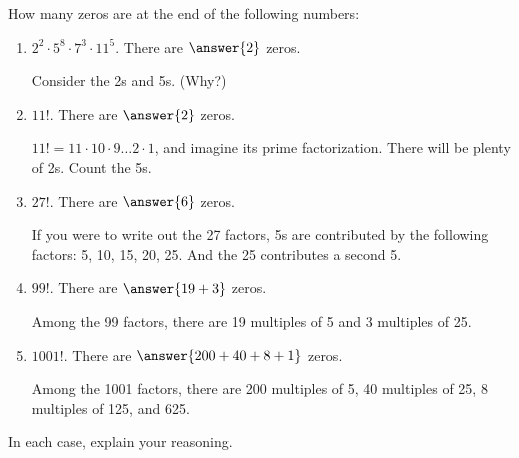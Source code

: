 \documentclass[nooutcomes]{ximera}
\begin{document}
\begin{problem}
How many zeros are at the end of the following numbers:
\begin{enumerate}
\item $2^2 \cdot 5^8 \cdot 7^3\cdot 11^5$. There are $\answer{2}$ zeros. 	\begin{hint}Consider the 2s and 5s.  (Why?)\end{hint}
\item $11!$. There are $\answer{2}$ zeros.
\begin{hint}$11! = 11\cdot10\cdot9\dots2\cdot1$, and imagine its prime factorization.  There will be plenty of 2s. Count the 5s.\end{hint}
\item $27!$. There are $\answer{6}$ zeros.
 \begin{hint}If you were to write out the 27 factors, 5s are contributed by the following factors:  5, 10, 15, 20, 25.  And the 25 contributes a second 5.\end{hint}
\item $99!$. There are $\answer{19+3}$ zeros. 
  \begin{hint}Among the 99 factors, there are 19 multiples of 5 and 3 multiples of 25.\end{hint}
\item $1001!$. There are $\answer{200+40+8+1}$ zeros.
  \begin{hint}Among the 1001 factors, there are 200 multiples of 5, 40 multiples of 25, 8 multiples of 125, and 625.\end{hint}
\end{enumerate}
In each case, explain your reasoning.
\end{problem}
\end{document}
